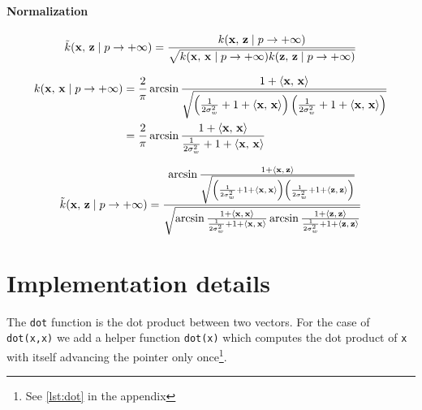 \paragraph{Normalization}

\begin{equation}
    \tilde{k}(\mathbf{x},\,\mathbf{z} \mid p \to + \infty) = \frac{
        k(\mathbf{x},\,\mathbf{z} \mid p \to + \infty) }{
        \sqrt{
            k(\mathbf{x},\,\mathbf{x} \mid p \to + \infty)
            k(\mathbf{z},\,\mathbf{z} \mid p \to + \infty)
        }
    }
\end{equation}

\begin{align*}
    k(\mathbf{x},\,\mathbf{x} \mid p \to + \infty)
     & = \frac{2}{\pi}
    \arcsin \frac{1 + \left\langle \mathbf{x},\,\mathbf{x} \right\rangle}{\sqrt{
            \left(
            \frac{1}{2\sigma_w^2} + 1 + \left\langle \mathbf{x},\,\mathbf{x} \right\rangle
            \right)
            \left(
            \frac{1}{2\sigma_w^2} + 1 + \left\langle \mathbf{x},\,\mathbf{x} \right\rangle
            \right)
    }}                 \\
     & = \frac{2}{\pi}
    \arcsin \frac{1 + \left\langle \mathbf{x},\,\mathbf{x} \right\rangle}{
        \frac{1}{2\sigma_w^2} + 1 + \left\langle \mathbf{x},\,\mathbf{x} \right\rangle
    }
\end{align*}

\begin{equation}
    \tilde{k}(\mathbf{x},\,\mathbf{z} \mid p \to + \infty) =
    \frac{
        \arcsin \frac{1 + \left\langle \mathbf{x},\,\mathbf{z} \right\rangle}{\sqrt{
                \left(
                \frac{1}{2\sigma_w^2} + 1 + \left\langle \mathbf{x},\,\mathbf{x} \right\rangle
                \right)
                \left(
                \frac{1}{2\sigma_w^2} + 1 + \left\langle \mathbf{z},\,\mathbf{z} \right\rangle
                \right)
            }}
    }{
        \sqrt{
            \arcsin \frac{1 + \left\langle \mathbf{x},\,\mathbf{x} \right\rangle}{
                \frac{1}{2\sigma_w^2} + 1 + \left\langle \mathbf{x},\,\mathbf{x} \right\rangle
            }
            \arcsin \frac{1 + \left\langle \mathbf{z},\,\mathbf{z} \right\rangle}{
                \frac{1}{2\sigma_w^2} + 1 + \left\langle \mathbf{z},\,\mathbf{z} \right\rangle
            }
        }
    }
\end{equation}

\section{Implementation details}

The \texttt{dot} function is the dot product between two vectors. For the case
of \texttt{dot(x,x)} we add a helper function \texttt{dot(x)}
which computes the dot product of \texttt{x} with itself advancing the pointer
only once\footnote{See \cref{lst:dot} in the appendix}.

